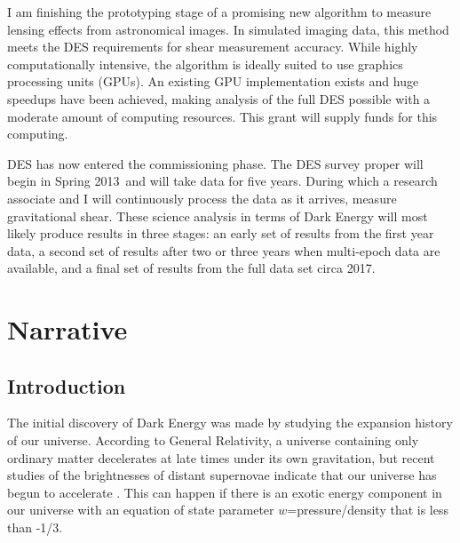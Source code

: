 \documentclass[12pt]{article}
\newcommand{\surveyproper}{Spring 2013}
\begin{document}
I am finishing the prototyping stage of a promising new algorithm to measure
lensing effects from astronomical images.  In simulated imaging data, this
method meets the DES requirements for shear measurement accuracy. While highly
computationally intensive, the algorithm is ideally suited to use graphics
processing units (GPUs). An existing GPU implementation exists and huge
speedups have been achieved, making analysis of the full DES possible with a
moderate amount of computing resources.   This grant will supply funds for this
computing.

DES has now entered the commissioning phase.  The DES survey proper will begin
in \surveyproper\ and will take data for five years. During which a research
associate and I will continuously process the data as it arrives, measure
gravitational shear.  These science analysis in terms of Dark Energy will most
likely produce results in three stages: an early set of results from the first
year data, a second set of results after two or three years when multi-epoch
data are available, and a final set of results from the full data set circa
2017.


\newpage
{}
\section*{Narrative}
\setcounter{section}{1}
\subsection{Introduction}

The initial discovery of Dark Energy was made by studying the expansion history
of our universe.  According to General Relativity, a universe containing only
ordinary matter decelerates at late times under its own gravitation, but recent
studies of the brightnesses of distant supernovae indicate that our universe
has begun to accelerate \cite{Riess98,Perlmutter99}.  This can happen if there
is an exotic energy component in our universe with an equation of state
parameter $w$=pressure/density that is less than -1/3.
\end{document}
